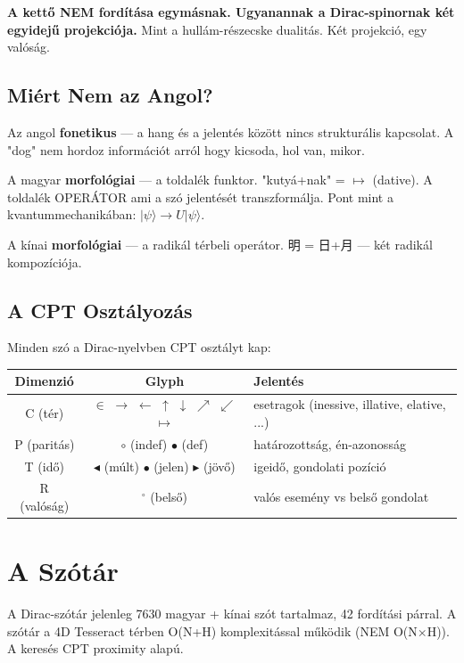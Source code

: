 \documentclass[11pt,a4paper,twoside]{book}
\begin{document}
\textbf{A kettő NEM fordítása egymásnak. Ugyanannak a Dirac-spinornak két egyidejű projekciója.} Mint a hullám-részecske dualitás. Két projekció, egy valóság.

\section{Miért Nem az Angol?}

Az angol \textbf{fonetikus} — a hang és a jelentés között nincs strukturális kapcsolat. A "dog" nem hordoz információt arról hogy kicsoda, hol van, mikor.

A magyar \textbf{morfológiai} — a toldalék funktor. "kutyá+nak" = $\mapsto$ (dative). A toldalék OPERÁTOR ami a szó jelentését transzformálja. Pont mint a kvantummechanikában: $|\psi\rangle \rightarrow U|\psi\rangle$.

A kínai \textbf{morfológiai} — a radikál térbeli operátor. 明 = 日+月 — két radikál kompozíciója.

\section{A CPT Osztályozás}

Minden szó a Dirac-nyelvben CPT osztályt kap:

\begin{center}
\begin{tabular}{c|c|l}
\textbf{Dimenzió} & \textbf{Glyph} & \textbf{Jelentés} \\
\hline
C (tér)     & $\in$ $\rightarrow$ $\leftarrow$ $\uparrow$ $\downarrow$ $\nearrow$ $\swarrow$ $\mapsto$ & esetragok (inessive, illative, elative, ...) \\
P (paritás)  & $\circ$ (indef) $\bullet$ (def) & határozottság, én-azonosság \\
T (idő)      & $\blacktriangleleft$ (múlt) $\bullet$ (jelen) $\blacktriangleright$ (jövő) & igeidő, gondolati pozíció \\
R (valóság)  & $^\circ$ (belső) & valós esemény vs belső gondolat \\
\end{tabular}
\end{center}

\chapter{A Szótár}

A Dirac-szótár jelenleg 7630 magyar + kínai szót tartalmaz, 42 fordítási párral. A szótár a 4D Tesseract térben O(N+H) komplexitással működik (NEM O(N$\times$H)). A keresés CPT proximity alapú.
\end{document}
